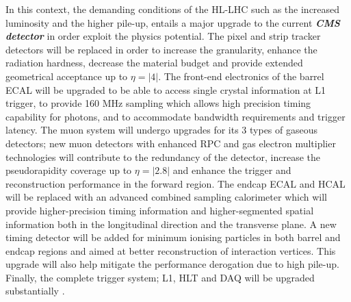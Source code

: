 In this context, the demanding conditions of the HL-LHC such as the increased luminosity and the higher pile-up, entails a major upgrade to the current \emph{\textbf{CMS detector}} in order exploit the physics potential. The pixel and strip tracker detectors will be replaced in order to increase the granularity, enhance the radiation hardness, decrease the material budget and provide extended geometrical acceptance up to $\eta = |4|$. The front-end electronics of the barrel ECAL will be upgraded to be able to access single crystal information at L1 trigger, to provide 160 MHz sampling which allows high precision timing capability for photons, and to accommodate bandwidth requirements and trigger latency. The muon system will undergo upgrades for its 3 types of gaseous detectors; new muon detectors with enhanced RPC and gas electron multiplier technologies will contribute to the redundancy of the detector, increase the pseudorapidity coverage up to $ \eta = |2.8|$ and enhance the trigger and reconstruction performance in the forward region. The endcap ECAL and HCAL will be replaced with an advanced combined sampling calorimeter which will provide higher-precision timing information and higher-segmented spatial information both in the longitudinal direction and the transverse plane. A new timing detector will be added for minimum ionising particles in both barrel and endcap regions and aimed at better reconstruction of interaction vertices. This upgrade will also help mitigate the performance derogation due to high pile-up. Finally, the complete trigger system; L1, HLT and DAQ will be upgraded substantially \cite{Contardo:2020886}.